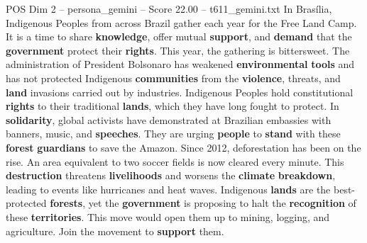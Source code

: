 \begin{textsample}{POS Dim 2 – persona\_gemini – Score 22.00 – t611\_gemini.txt}  \label{ex:f2_pos_042}
In Brasília, Indigenous Peoples from across Brazil gather each year for the Free Land Camp.
It is a time to share \textbf{knowledge}, offer mutual \textbf{support}, and \textbf{demand} that the \textbf{government} protect their \textbf{rights}.
This year, the gathering is bittersweet.
The administration of President Bolsonaro has weakened \textbf{environmental} \textbf{tools} and has not protected Indigenous \textbf{communities} from the \textbf{violence}, threats, and \textbf{land} invasions carried out by industries.
Indigenous Peoples hold constitutional \textbf{rights} to their traditional \textbf{lands}, which they have long fought to protect.
In \textbf{solidarity}, global activists have demonstrated at Brazilian embassies with banners, music, and \textbf{speeches}.
They are urging \textbf{people} to \textbf{stand} with these \textbf{forest} \textbf{guardians} to save the Amazon.
Since 2012, deforestation has been on the rise.
An area equivalent to two soccer fields is now cleared every minute.
This \textbf{destruction} threatens \textbf{livelihoods} and worsens the \textbf{climate} \textbf{breakdown}, leading to events like hurricanes and heat waves.
Indigenous \textbf{lands} are the best-protected \textbf{forests}, yet the \textbf{government} is proposing to halt the \textbf{recognition} of these \textbf{territories}.
This move would open them up to mining, logging, and agriculture.
Join the movement to \textbf{support} them.

\end{textsample}
